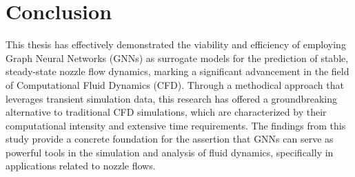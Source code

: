 \chapter{Conclusion}
\label{chap:Conclusion}
This thesis has effectively demonstrated the viability and efficiency of employing Graph Neural Networks (GNNs) as surrogate models for the prediction of stable, steady-state nozzle flow dynamics, marking a significant advancement in the field of Computational Fluid Dynamics (CFD). Through a methodical approach that leverages transient simulation data, this research has offered a groundbreaking alternative to traditional CFD simulations, which are characterized by their computational intensity and extensive time requirements. The findings from this study provide a concrete foundation for the assertion that GNNs can serve as powerful tools in the simulation and analysis of fluid dynamics, specifically in applications related to nozzle flows.
